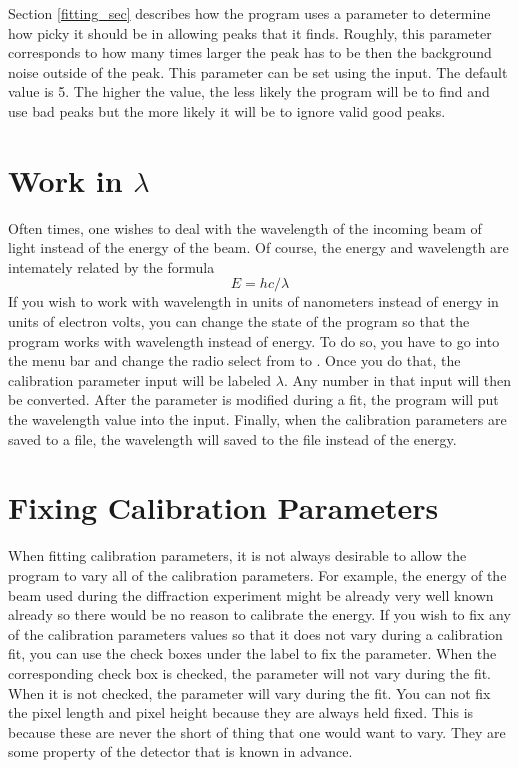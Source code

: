 Section \ref{fitting_sec} describes how the program
uses a parameter to determine how picky it should
be in allowing peaks that it finds. Roughly, this
parameter corresponds to how many times larger
the peak has to be then the background noise outside
of the peak. This parameter can be set using the 
 input. The default value is 5. The higher 
the value, the less likely the program will be to find
and use bad peaks but the more likely it will be to
ignore valid good peaks.

\section{\texorpdfstring{Work in 
    $\lambda$}{Work in Lambda}}
    \label{workWavelength}

Often times, one wishes to deal with the wavelength 
of the incoming beam of light instead of the energy
of the beam. Of course, the energy and wavelength
are intemately related by the formula
\begin{equation}
    E=hc/\lambda
\end{equation}
If you wish to work with wavelength in units of
nanometers instead of energy in units of electron 
volts, you can change the state of the program so 
that the program works with wavelength instead
of energy. To do so, you have to go into the menu bar
and change the radio select from 
to . Once you do that, the 
calibration parameter input will be labeled
$\lambda$. Any number in that input will then be converted.
After the parameter is modified during a fit,
the program will put the wavelength value into
the input. Finally, when the calibration
parameters are saved to a file, the wavelength will
saved to the file instead of the energy.


\section{Fixing Calibration Parameters}
\label{fix_parameters}

When fitting calibration parameters, it is not
always desirable to allow the program to vary
all of the calibration parameters. For example,
the energy of the beam used during the diffraction
experiment might be already very well known already
so there would be no reason to calibrate the energy.
If you wish to fix any of the calibration parameters
values so that it does not vary during a calibration
fit, you can use the check boxes under the 
label to fix the parameter. When the corresponding
check box is checked, the parameter will not vary
during the fit. When it is not checked, the
parameter will vary during the fit. You
can not fix the pixel length and 
pixel height because they are always held fixed. This is 
because these are never
the short of thing that one would want to vary.
They are some property of the detector that is known in
advance.


